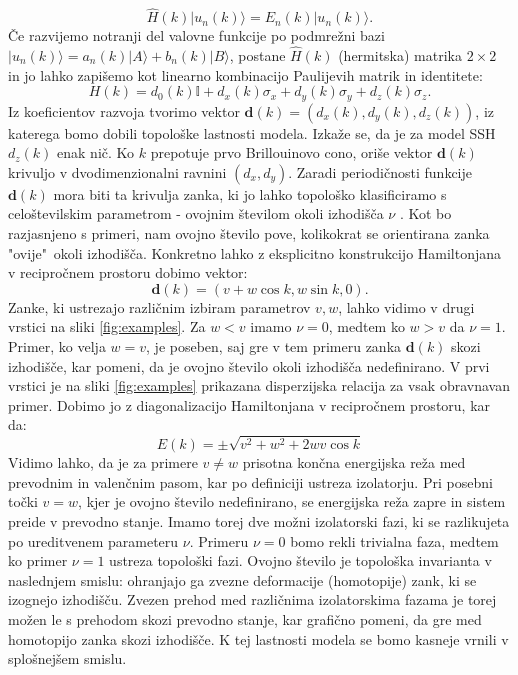 \begin{equation}
\hat{H}(k) | u_n(k) \rangle = E_n(k) | u_n(k) \rangle.
\end{equation}
Če razvijemo notranji del valovne funkcije po podmrežni bazi $|u_n(k) \rangle = a_n(k) |A \rangle + b_n(k) | B \rangle$,
postane $\hat{H}(k)$ (hermitska) matrika $2 \times 2$ in jo lahko zapišemo kot linearno kombinacijo Paulijevih matrik in identitete:
\begin{equation} \label{spomnimo1}
H(k) = d_0 (k) \mathbb{I}+ d_x(k) \sigma_x + d_y (k) \sigma_y + d_z(k) \sigma_z.
\end{equation}
Iz koeficientov razvoja tvorimo vektor $\mathbf{d}(k) = (d_x (k), d_y (k) ,d_z (k) )$, iz katerega bomo dobili topološke lastnosti modela. Izkaže se, da je za model SSH $d_z(k)$ enak nič. Ko $k$ prepotuje prvo Brillouinovo cono, oriše vektor $\mathbf{d}(k)$ krivuljo v dvodimenzionalni ravnini $(d_x,d_y)$. Zaradi periodičnosti funkcije $\mathbf{d}(k)$ mora biti ta krivulja zanka, ki jo lahko topološko klasificiramo s celoštevilskim parametrom - ovojnim številom okoli izhodišča $\nu$ \cite{hatcher}. Kot bo razjasnjeno s primeri, nam ovojno število pove, kolikokrat se orientirana zanka "ovije"\   okoli izhodišča.
Konkretno lahko z eksplicitno konstrukcijo Hamiltonjana v recipročnem prostoru dobimo vektor:
\begin{equation}
\mathbf{d}(k) = (v + w \cos k, w \sin k, 0).
\end{equation}
Zanke, ki ustrezajo različnim izbiram parametrov $v, w$, lahko vidimo v drugi vrstici na sliki \ref{fig:examples}. Za $w < v$ imamo $\nu = 0$, medtem ko $w > v$ da $\nu=1$. Primer, ko velja $w=v$, je poseben, saj gre v tem primeru zanka $\mathbf{d}(k)$ skozi izhodišče, kar pomeni, da je ovojno število okoli izhodišča nedefinirano.
V prvi vrstici je na sliki \ref{fig:examples} prikazana disperzijska relacija za vsak obravnavan primer. Dobimo jo z diagonalizacijo Hamiltonjana v recipročnem prostoru, kar da:
\begin{equation}
E(k) = \pm \sqrt{v^2 + w^2 + 2 w v \cos k}
\end{equation}
Vidimo lahko, da je za primere $v \neq w$ prisotna končna energijska reža med prevodnim in valenčnim pasom, kar po definiciji ustreza izolatorju. Pri posebni točki $v=w$, kjer je ovojno število nedefinirano, se energijska reža zapre in sistem preide v prevodno stanje. Imamo torej dve možni izolatorski fazi, ki se razlikujeta po ureditvenem parameteru $\nu$. Primeru $\nu=0$ bomo rekli trivialna faza, medtem ko primer $\nu=1$ ustreza topološki fazi. Ovojno število je topološka invarianta v naslednjem smislu: ohranjajo ga zvezne deformacije (homotopije) zank, ki se izognejo izhodišču. Zvezen prehod med različnima izolatorskima fazama je torej možen le s prehodom skozi prevodno stanje, kar grafično pomeni, da gre med homotopijo zanka skozi izhodišče. K tej lastnosti modela se bomo kasneje vrnili v splošnejšem smislu.
